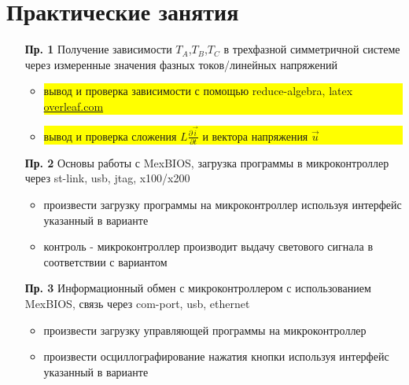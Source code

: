 \section{Практические занятия}
\begin{itemize}
\item[\bf{Пр. 1}]{Получение зависимости $T_A$,$T_B$,$T_C$ в трехфазной симметричной системе через измеренные значения фазных токов/линейных напряжений}
      \begin{itemize}
          \item \colorbox{yellow}{\parbox[t]{\textwidth}{вывод и проверка зависимости с помощью reduce-algebra, latex \url{overleaf.com}}}
          \item \colorbox{yellow}{\parbox[t]{0.85\textwidth}{вывод и проверка сложения $L \frac{\displaystyle \partial \vec{i}}{\displaystyle \partial t}$ и вектора напряжения $\vec{u}$}}
       \end{itemize}

\item[\bf{Пр. 2}]{Основы работы с MexBIOS, загрузка программы в микроконтроллер через st-link, usb, jtag, x100/x200}
     \begin{itemize}
        \item произвести загрузку программы на микроконтроллер используя интерфейс указанный в варианте
        \item контроль - микроконтроллер производит выдачу светового сигнала в соответствии с вариантом
     \end{itemize}

\item[\bf{Пр. 3}]{Информационный обмен с микроконтроллером с использованием MexBIOS, связь через com-port, usb, ethernet} 
     \begin{itemize}
        \item произвести загрузку управляющей программы на микроконтроллер
        \item произвести осциллографирование нажатия кнопки используя интерфейс указанный в варианте
     \end{itemize}

\end{itemize}

\newpage
